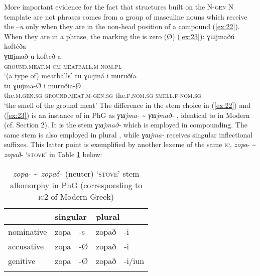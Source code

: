\documentclass[output=paper]{LSP/langsci}
\begin{document}
More important evidence for the fact that structures built on the N-\textsc{gen} N template are not  phrases comes from a group of masculine nouns which receive the –\textit{u}  only when they are in the non-head position of a compound (\ref{ex:22}). When they are in a  phrase, the  marking the  is zero (\O) (\ref{ex:23}):
\ea\label{ex:22}
	\glll ɣɯjmaðú koftéða\\
			ɣɯjmað-u kofteð-a\\
			\textsc{ground.meat.m-cm} \textsc{meatball.m-nom.pl}\\
	\glt `(a type of) meatballs'
\z
\ea\label{ex:23}
	\glll tu ɣɯjmá i  muruðía\\
			tu ɣɯjma-{\O} i muruðia-\O\\
			the.\textsc{m.gen.sg} \textsc{ground.meat.m-gen.sg} the.\textsc{f.nom.sg} \textsc{smell.f-nom.sg}\\
	\glt `the smell of the ground meat'
\z
The difference in the stem choice in (\ref{ex:22}) and (\ref{ex:23}) is an instance of  in PhG as \textit{ɣɯjma-} {\textasciitilde} \textit{ɣɯjmað-} , identical to  in Modern  (cf. Section 2). It is the stem \textit{ɣɯjmað-} which is employed in compounding. The same stem is also employed in plural , while \textit{ɣɯjma-} receives singular inflectional suffixes. This latter point is exemplified by another lexeme of the same \textsc{ic}, \textit{zopa}-  {\textasciitilde} \textit{zopað}- ‘\textsc{stove}’ in Table \ref{table3} below:
\begin{table}[h!]
\caption{\textit{zopa-} {\textasciitilde} \textit{zopa$\delta$-} (neuter) `\textsc{stove}' stem allomorphy in PhG (corresponding to \textsc{ic2} of Modern Greek)}
\label{table3}
\begin{tabularx}{.75\textwidth}{XlXlX}
 \lsptoprule
           & \multicolumn{2}{l}{singular} & \multicolumn{2}{l}{plural} \\
\midrule
{nominative} & zopa           & -s         & zopað         & -i         \\
{accusative} & zopa           & -\O        & zopað         & -i         \\
{genitive}   &  zopa          & -\O        & zopað         & -i/iun        \\
\lspbottomrule      
\end{tabularx}
\end{table}
\end{document}

